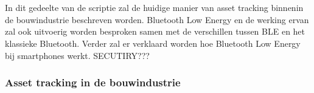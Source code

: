 \chapter{}%
\label{ch:stand-van-zaken}



%
%

In dit gedeelte van de scriptie zal de huidige manier van asset tracking binnenin de bouwindustrie beschreven worden. Bluetooth Low Energy en de werking ervan zal ook uitvoerig worden besproken samen met de verschillen tussen BLE en het klassieke Bluetooth. Verder zal er verklaard worden hoe Bluetooth Low Energy bij smartphones werkt. SECUTIRY???

\subsection{Asset tracking in de bouwindustrie}

